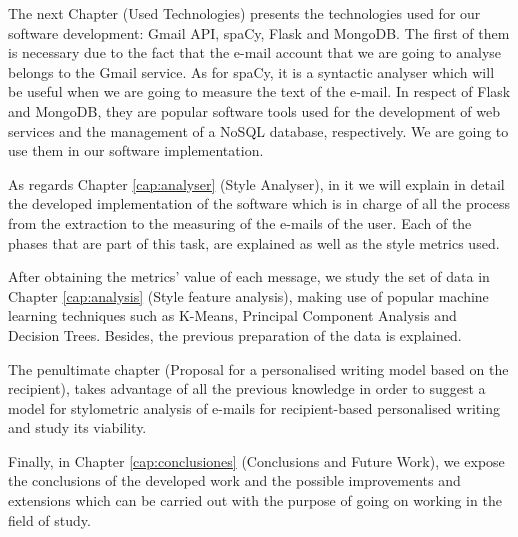 The next Chapter (Used Technologies) presents the technologies used for our software development: Gmail API, spaCy, Flask and MongoDB. The first of them is necessary due to the fact that the e-mail account that we are going to analyse belongs to the Gmail service. As for spaCy, it is a syntactic analyser which will be useful when we are going to measure the text of the e-mail. In respect of Flask and MongoDB, they are popular software tools used for the development of web services and the management of a NoSQL database, respectively. We are going to use them in our software implementation.

As regards Chapter \ref{cap:analyser} (Style Analyser), in it we will explain in detail the developed implementation of the software which is in charge of all the process from the extraction to the measuring of the e-mails of the user. Each of the phases that are part of this task, are explained as well as the style metrics used.

After obtaining the metrics' value of each message, we study the set of data in Chapter \ref{cap:analysis} (Style feature analysis), making use of popular machine learning techniques such as K-Means, Principal Component Analysis and Decision Trees. Besides, the previous preparation of the data is explained.

The penultimate chapter (Proposal for a personalised writing model based on the recipient), takes advantage of all the previous knowledge in order to suggest a model for stylometric analysis of e-mails for recipient-based personalised writing and study its viability.

Finally, in Chapter \ref{cap:conclusiones} (Conclusions and Future Work), we expose the conclusions of the developed work and the possible improvements and extensions which can be carried out with the purpose of going on working in the field of study.